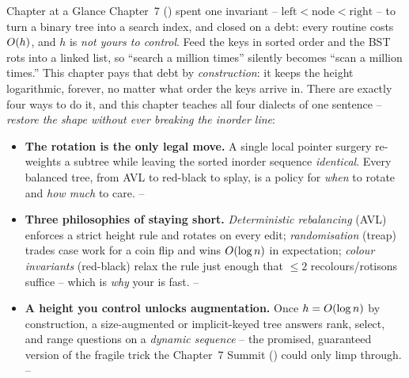 
\begin{chaptertheorybox}{Chapter at a Glance}
Chapter~7 () spent one invariant -- $\text{left}<\text{node}<\text{right}$ -- to turn a
binary tree into a search index, and closed on a debt: every routine costs $O(h)$, and $h$ is
\emph{not yours to control}. Feed the keys in sorted order and the BST rots into a linked list, so
``search a million times'' silently becomes ``scan a million times.'' This chapter pays that debt by
\emph{construction}: it keeps the height logarithmic, forever, no matter what order the keys arrive
in. There are exactly four ways to do it, and this chapter teaches all four dialects of one sentence
-- \emph{restore the shape without ever breaking the inorder line}:
\begin{itemize}[nosep]
  \item \textbf{The rotation is the only legal move.} A single local pointer surgery re-weights a
        subtree while leaving the sorted inorder sequence \emph{identical}. Every balanced tree, from
        AVL to red-black to splay, is a policy for \emph{when} to rotate and \emph{how much} to care.
        \hfill {}--
  \item \textbf{Three philosophies of staying short.} \emph{Deterministic rebalancing} (AVL) enforces
        a strict height rule and rotates on every edit; \emph{randomisation} (treap) trades case work
        for a coin flip and wins $O(\log n)$ in expectation; \emph{colour invariants} (red-black)
        relax the rule just enough that $\le 2$ recolours/rotisons suffice -- which is \emph{why} your
         is fast. \hfill {}--
  \item \textbf{A height you control unlocks augmentation.} Once $h=O(\log n)$ by construction, a
        size-augmented or implicit-keyed tree answers rank, select, and range questions on a
        \emph{dynamic sequence} -- the promised, guaranteed version of the fragile trick the Chapter~7
        Summit () could only limp through. \hfill {}--
\end{itemize}


\end{chaptertheorybox}
